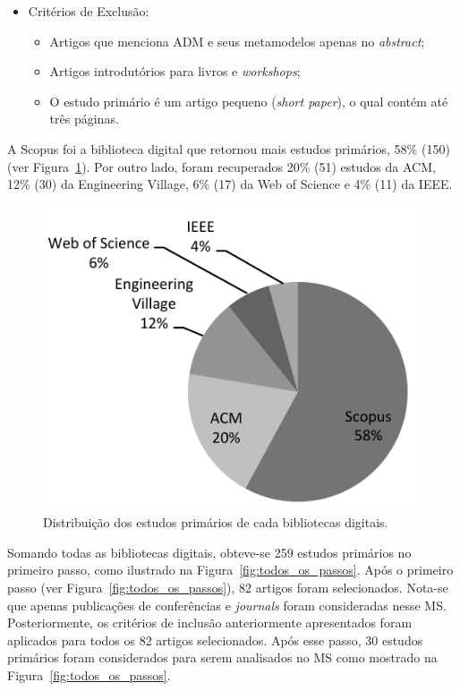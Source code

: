 \begin{itemize}
\item Critérios de Exclusão:
    \begin{itemize}
    \item Artigos que menciona ADM e seus metamodelos apenas no \textit{abstract};
    \item Artigos introdutórios para livros e \textit{workshops};
    \item O estudo primário é um artigo pequeno (\textit{short paper}), o qual contém até três páginas.
    \end{itemize}
\end{itemize}

A Scopus foi a biblioteca digital que retornou mais estudos primários, 58\% (150) (ver Figura~\ref{fig:distribuicao_biblioteca_digital}). Por outro lado, foram recuperados 20\% (51) estudos da ACM, 12\% (30) da Engineering Village, 6\% (17) da Web of Science e 4\% (11) da IEEE. 

\begin{figure}[h]
 \caption{Distribuição dos estudos primários de cada bibliotecas digitais.}
 \label{fig:distribuicao_biblioteca_digital}
 \centering
 \includegraphics[scale=0.9]{images/retornoDasBasesMS}
 \fautor
\end{figure}

Somando todas as bibliotecas digitais, obteve-se 259 estudos primários no primeiro passo, como ilustrado na Figura~\ref{fig:todos_os_passos}. Após o primeiro passo (ver Figura~\ref{fig:todos_os_passos}), 82 artigos foram selecionados. Nota-se que apenas publicações de conferências e \textit{journals} foram consideradas nesse MS. Posteriormente, os critérios de inclusão anteriormente apresentados foram aplicados para todos os 82 artigos selecionados. Após esse passo, 30 estudos primários foram considerados para serem analisados no MS como mostrado na Figura~\ref{fig:todos_os_passos}.

